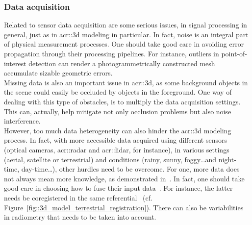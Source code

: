         \subsubsection{Data acquisition}
            Related to sensor data acquisition are some serious issues, in signal processing in general, just as in \gls{acr::3d} modeling in particular.
            In fact, noise is an integral part of physical measurement processes.
            One should take good care in avoiding error propagation through their processing pipelines.
            For instance, outliers in point-of-interest detection can render a photogrammetrically constructed mesh accumulate sizable geometric errors.\\
            Missing data is also an important issue in \gls{acr::3d}, as some background objects in the scene could easily be occluded by objects in the foreground.
            One way of dealing with this type of obstacles, is to multiply the data acquisition settings.
            This can, actually, help mitigate not only occlusion problems but also noise interference.\\
            However, too much data heterogeneity can also hinder the \gls{acr::3d} modeling process.
            In fact, with more accessible data acquired using different sensors (optical cameras, \gls{acr::radar} and \gls{acr::lidar}, for instance), in various settings (aerial, satellite or terrestrial) and conditions (rainy, sunny, foggy\dots and night-time, day-time\dots), other hurdles need to be overcome.
            For one, more data does not always mean more knowledge, as demonstrated in~\textcite{brachmann2018learning}.
            In fact, one should take good care in choosing how to fuse their input data~\parencite{kedzierski2014terrestrial}.
            For instance, the latter needs be coregistered in the same referential~\parencite{monnier2013registration, mezian2016uncertainty} (cf. Figure~\ref{fig::3d_model_terrestrial_registration}).
            There can also be variabilities in radiometry that needs to be taken into account.\addref
